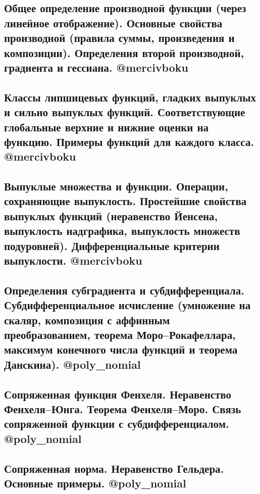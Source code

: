 \documentclass[a4paper, 16pt]{article}
\begin{document}
    

    \subsection{Общее определение производной функции (через линейное отображение). Основные свойства производной (правила суммы, произведения и композиции). Определения второй производной, градиента и гессиана. @mercivboku}

    

    \subsection{Классы липшицевых функций, гладких выпуклых и сильно выпуклых функций. Соответствующие глобальные верхние и нижние оценки на функцию. Примеры функций для каждого класса. @mercivboku}

    

    \subsection{Выпуклые множества и функции. Операции, сохраняющие выпуклость. Простейшие свойства выпуклых функций (неравенство Йенсена, выпуклость надграфика, выпуклость множеств подуровней). Дифференциальные критерии выпуклости. @mercivboku}

    

    \subsection{Определения субградиента и субдифференциала. Субдифференциальное исчисление (умножение на скаляр, композиция с аффинным преобразованием, теорема Моро–Рокафеллара, максимум конечного числа функций и теорема Данскина). @poly\_nomial}

    

    \subsection{Сопряженная функция Фенхеля. Неравенство Фенхеля–Юнга. Теорема Фенхеля–Моро. Связь сопряженной функции с субдифференциалом. @poly\_nomial}

    

    \subsection{Сопряженная норма. Неравенство Гельдера. Основные примеры. @poly\_nomial}
\end{document}
